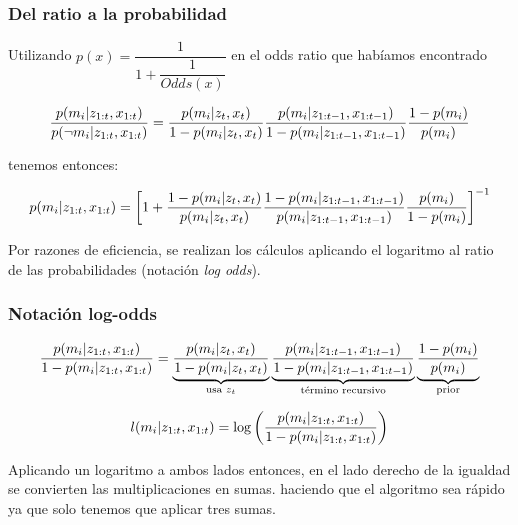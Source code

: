 \begin{frame}
    \frametitle{Del ratio a la probabilidad}
    
    Utilizando $p(x) = \dfrac{1}{1 + \dfrac{1}{Odds(x)}}$ en el odds ratio que habíamos encontrado
    
    \begin{equation*}
         \dfrac{p(m_{i}| z_{1:t}, x_{1:t})}{p(\neg m_{i}| z_{1:t}, x_{1:t})} = \dfrac{p(m_{i} | z_{t}, x_{t})}{1 - p(m_{i} | z_{t}, x_{t})}
        \dfrac{p(m_{i} | z_{1:t-1}, x_{1:t-1})}{1- p(m_{i} | z_{1:t-1}, x_{1:t-1})}
        \dfrac{1 - p(m_{i})} {p(m_{i})}
    \end{equation*}

tenemos entonces:

    \begin{equation*}
    p(m_{i}| z_{1:t}, x_{1:t}) =
    \left[
        1 + 
         \dfrac{1 - p(m_{i} | z_{t}, x_{t})}{p(m_{i} | z_{t}, x_{t})}
        \dfrac{1- p(m_{i} | z_{1:t-1}, x_{1:t-1})}{p(m_{i} | z_{1:t-1}, x_{1:t-1})}
        \dfrac{p(m_{i})}{1 - p(m_{i})}
    \right]^{-1}
    \end{equation*}

    Por razones de eficiencia, se realizan los cálculos aplicando el logaritmo al ratio de las probabilidades (notación \emph{log odds}).
\end{frame}

\begin{frame}
    \frametitle{Notación log-odds}
    \begin{equation*}
        \dfrac{p(m_{i}| z_{1:t}, x_{1:t})}{1 - p(m_{i}| z_{1:t}, x_{1:t})} =  \underbrace{\dfrac{p(m_{i} | z_{t}, x_{t})}{1 - p(m_{i} | z_{t}, x_{t})}}_{\text{usa } z_{t}}
        \underbrace{\dfrac{p(m_{i} | z_{1:t-1}, x_{1:t-1})}{1- p(m_{i} | z_{1:t-1}, x_{1:t-1})}}_{\text{término recursivo}}
        \underbrace{\dfrac{1 - p(m_{i})} {p(m_{i})}}_{\text{prior}}
    \end{equation*}

    \begin{equation*}
   l(m_{i}| z_{1:t}, x_{1:t}) =  \log \left( \dfrac{p(m_{i} | z_{1:t}, x_{1:t})}{1 - p(m_{i} | z_{1:t}, x_{1:t})} \right)
    \end{equation*}

    Aplicando un logaritmo a ambos lados entonces, en el lado derecho de la igualdad se convierten las multiplicaciones en sumas. haciendo que el algoritmo sea rápido ya que solo tenemos que aplicar tres sumas.

\end{frame}

